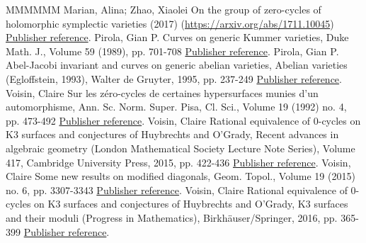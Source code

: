 \begin{thebibliography}{MMMMMM}
 Marian, Alina; Zhao, Xiaolei On the group of zero-cycles of holomorphic symplectic varieties (2017) (\url{https://arxiv.org/abs/1711.10045}) \href{https://ahl.centre-mersenne.org/item/AHL_2018__1__313_0/#marian}{Publisher reference}.
 Pirola, Gian P. Curves on generic Kummer varieties, Duke Math. J., Volume 59 (1989), pp. 701-708 \href{https://ahl.centre-mersenne.org/item/AHL_2018__1__313_0/#pirola}{Publisher reference}.
 Pirola, Gian P. Abel-Jacobi invariant and curves on generic abelian varieties, Abelian varieties (Egloffstein, 1993), Walter de Gruyter, 1995, pp. 237-249 \href{https://ahl.centre-mersenne.org/item/AHL_2018__1__313_0/#pirola2}{Publisher reference}.
 Voisin, Claire Sur les zéro-cycles de certaines hypersurfaces munies d’un automorphisme, Ann. Sc. Norm. Super. Pisa, Cl. Sci., Volume 19 (1992) no. 4, pp. 473-492 \href{https://ahl.centre-mersenne.org/item/AHL_2018__1__313_0/#voisingodeaux}{Publisher reference}.
 Voisin, Claire Rational equivalence of 0-cycles on K3 surfaces and conjectures of Huybrechts and O’Grady, Recent advances in algebraic geometry (London Mathematical Society Lecture Note Series), Volume 417, Cambridge University Press, 2015, pp. 422-436 \href{https://ahl.centre-mersenne.org/item/AHL_2018__1__313_0/#voisink3}{Publisher reference}.
 Voisin, Claire Some new results on modified diagonals, Geom. Topol., Volume 19 (2015) no. 6, pp. 3307-3343 \href{https://ahl.centre-mersenne.org/item/AHL_2018__1__313_0/#voisindiag}{Publisher reference}.
 Voisin, Claire Rational equivalence of 0-cycles on K3 surfaces and conjectures of Huybrechts and O’Grady, K3 surfaces and their moduli (Progress in Mathematics), Birkhäuser/Springer, 2016, pp. 365-399 \href{https://ahl.centre-mersenne.org/item/AHL_2018__1__313_0/#voisinisot}{Publisher reference}.
\end{thebibliography}
